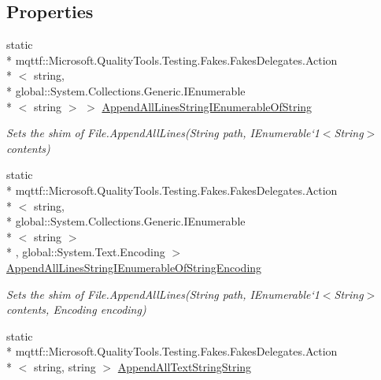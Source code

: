 \subsection*{Properties}
\begin{DoxyCompactItemize}
\item 
static \\*
mqttf\-::\-Microsoft.\-Quality\-Tools.\-Testing.\-Fakes.\-Fakes\-Delegates.\-Action\\*
$<$ string, \\*
global\-::\-System.\-Collections.\-Generic.\-I\-Enumerable\\*
$<$ string $>$ $>$ \hyperlink{class_system_1_1_i_o_1_1_fakes_1_1_shim_file_abd381edc3715b0d0774ee955c8fccb3e}{Append\-All\-Lines\-String\-I\-Enumerable\-Of\-String}
\begin{DoxyCompactList}\small\item\em Sets the shim of File.\-Append\-All\-Lines(String path, I\-Enumerable`1$<$String$>$ contents)\end{DoxyCompactList}\item 
static \\*
mqttf\-::\-Microsoft.\-Quality\-Tools.\-Testing.\-Fakes.\-Fakes\-Delegates.\-Action\\*
$<$ string, \\*
global\-::\-System.\-Collections.\-Generic.\-I\-Enumerable\\*
$<$ string $>$\\*
, global\-::\-System.\-Text.\-Encoding $>$ \hyperlink{class_system_1_1_i_o_1_1_fakes_1_1_shim_file_a692ed8991f0aedf0c2980874d773be9b}{Append\-All\-Lines\-String\-I\-Enumerable\-Of\-String\-Encoding}
\begin{DoxyCompactList}\small\item\em Sets the shim of File.\-Append\-All\-Lines(String path, I\-Enumerable`1$<$String$>$ contents, Encoding encoding)\end{DoxyCompactList}\item 
static \\*
mqttf\-::\-Microsoft.\-Quality\-Tools.\-Testing.\-Fakes.\-Fakes\-Delegates.\-Action\\*
$<$ string, string $>$ \hyperlink{class_system_1_1_i_o_1_1_fakes_1_1_shim_file_a38f4cae7502ad7ff1b88efa42ddc705f}{Append\-All\-Text\-String\-String}

\end{DoxyCompactItemize}

